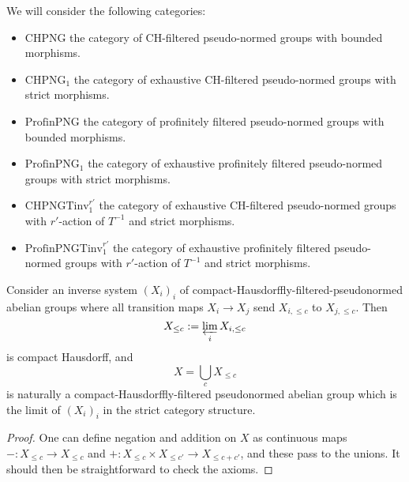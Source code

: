 \begin{definition}
  \label{png-cats}
  We will consider the following categories:
  \begin{itemize}
    \item $\text{CHPNG}$ the category of CH-filtered pseudo-normed groups with bounded morphisms.
    \item $\text{CHPNG}_1$ the category of exhaustive CH-filtered pseudo-normed groups with strict morphisms.
    \item $\text{ProfinPNG}$ the category of profinitely filtered pseudo-normed groups with bounded morphisms.
    \item $\text{ProfinPNG}_1$ the category of exhaustive profinitely filtered pseudo-normed groups with strict morphisms.
    \item $\text{CHPNGTinv}_1^{r'}$ the category of exhaustive CH-filtered pseudo-normed groups with $r'$-action of $T^{-1}$ and strict morphisms.
    \item $\text{ProfinPNGTinv}_1^{r'}$ the category of exhaustive profinitely filtered pseudo-normed groups with $r'$-action of $T^{-1}$ and strict morphisms.
  \end{itemize}
\end{definition}

\begin{proposition}
  \label{bounded-limits}
  Consider an inverse system $(X_i)_i$ of compact-Hausdorffly-filtered-pseudonormed abelian groups
  where all transition maps $X_i\to X_j$ send $X_{i,\leq c}$ to $X_{j,\leq c}$.
  Then
  \[ X_{\leq c} := \varprojlim_i X_{i,\leq c} \]
  is compact Hausdorff, and
  \[ X=\bigcup_c X_{\leq c} \]
  is naturally a compact-Hausdorffly-filtered pseudonormed abelian group
  which is the limit of $(X_i)_i$ in the strict category structure.
\end{proposition}

\begin{proof}
  One can define negation and addition on $X$ as continuous maps
  $-: X_{\leq c}\to X_{\leq c}$ and $+: X_{\leq c}\times X_{\leq c'}\to X_{\leq c+c'}$, and these pass to the unions.
  It should then be straightforward to check the axioms.
\end{proof}


